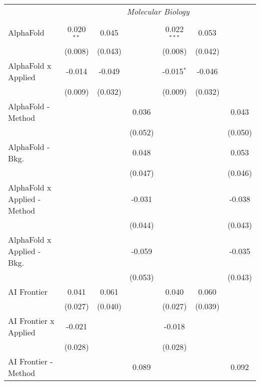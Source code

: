 \begin{tabular}{lcccccc}
 & \multicolumn{6}{c}{\textit{Molecular Biology}} \\ \\
   AlphaFold                    & 0.020$^{**}$ & 0.045   &         & 0.022$^{***}$ & 0.053       &   \\   
                                & (0.008)      & (0.043) &         & (0.008)       & (0.042)     &   \\   
   AlphaFold x Applied          & -0.014       & -0.049  &         & -0.015$^{*}$  & -0.046      &   \\   
                                & (0.009)      & (0.032) &         & (0.009)       & (0.032)     &   \\   
   AlphaFold - Method           &              &         & 0.036   &               &             & 0.043\\   
                                &              &         & (0.052) &               &             & (0.050)\\   
   AlphaFold - Bkg.             &              &         & 0.048   &               &             & 0.053\\   
                                &              &         & (0.047) &               &             & (0.046)\\   
   AlphaFold x Applied - Method &              &         & -0.031  &               &             & -0.038\\   
                                &              &         & (0.044) &               &             & (0.043)\\   
   AlphaFold x Applied - Bkg.   &              &         & -0.059  &               &             & -0.035\\   
                                &              &         & (0.053) &               &             & (0.043)\\   
   AI Frontier                  & 0.041        & 0.061   &         & 0.040         & 0.060       &   \\   
                                & (0.027)      & (0.040) &         & (0.027)       & (0.039)     &   \\   
   AI Frontier x Applied        & -0.021       &         &         & -0.018        &             &   \\   
                                & (0.028)      &         &         & (0.028)       &             &   \\   
   AI Frontier - Method         &              &         & 0.089   &               &             & 0.092\\   

\end{tabular}
